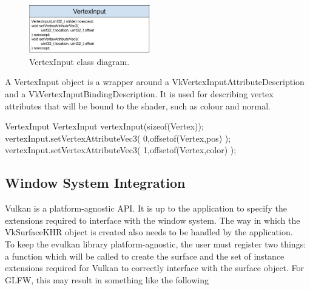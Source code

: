 \documentclass[12pt]{report}
\newcommand{\imagewidth}{0.47\textwidth}
\theoremstyle{definition}
\begin{document}
        \begin{figure}[h!]
          \begin{centering}
          \includegraphics[width=\imagewidth]{images/class_vertexinput.png}
          \caption{VertexInput class diagram.}
          \end{centering}
          \label{fig:class_vertexinput}
        \end{figure}

        A VertexInput object is a wrapper around a VkVertexInputAttributeDescription
        and a VkVertexInputBindingDescription. It is used for describing vertex
        attributes that will be bound to the shader, such as colour and normal.

        \begin{usage}{VertexInput}
  VertexInput vertexInput(sizeof(Vertex));
  vertexInput.setVertexAttributeVec3(
    0,offsetof(Vertex,pos)
  );
  vertexInput.setVertexAttributeVec3(
    1,offsetof(Vertex,color)
  );
        \end{usage}

      \subsection{Window System Integration}

        Vulkan is a platform-agnostic API. It is up to the application to
        specify the extensions required to interface with the window system.
        The way in which the VkSurfaceKHR object is created also needs to be
        handled by the application. \\

        To keep the evulkan library platform-agnostic, the user must register
        two things: a function which will be called to create the surface
        and the set of instance extensions required for Vulkan to correctly
        interface with the surface object. For GLFW, this may result in
        something like the following
\end{document}
